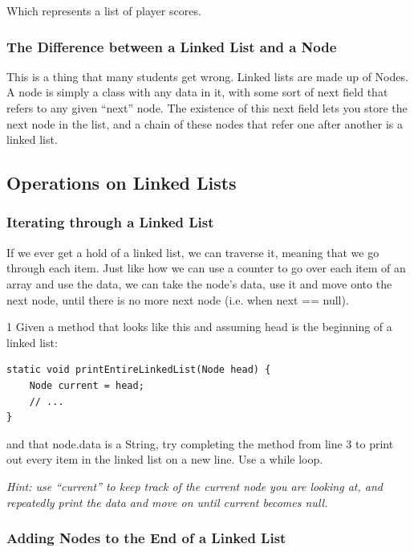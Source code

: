 \documentclass[./main.tex]{subfiles}
\begin{document}
Which represents a list of player scores.

\subsubsection{The Difference between a Linked List and a Node}

This is a thing that many students get wrong. Linked lists are made up of Nodes. A node is simply a class with any data in it, with some sort of
{\mono next} field that refers to any given ``next'' node. The existence of this next field lets you store the next node in the list, and a chain
of these nodes that refer one after another is a linked list.

\subsection{Operations on Linked Lists}

\subsubsection{Iterating through a Linked List}
\label{sec:linked-list-iteration}

If we ever get a hold of a linked list, we can traverse it, meaning that we go through each item. Just like how we can use
a counter to go over each item of an array and use the data, we can take the node's data, use it and move onto the next node, until
there is no more next node (i.e. when {\mono next == null}).

\begin{tryitbox}{1}
    Given a method that looks like this and assuming head is the beginning of a linked
    list:

    \begin{verbatim}
static void printEntireLinkedList(Node head) {
    Node current = head;
    // ...
}
    \end{verbatim}
    
    and that {\mono node.data} is a String, try completing the method from line 3
    to print out every item in the linked list on a new line. Use a while loop.

    \emph{Hint: use ``current'' to keep track of the current node you are looking at, and
    repeatedly print the data and move on until current becomes null.}
\end{tryitbox}

\subsubsection{Adding Nodes to the End of a Linked List}
\label{sec:linked-list-append}
\end{document}
